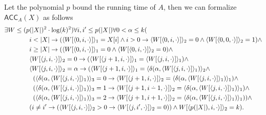 \documentclass{LMCS}
\newcommand{\abs}[1]{\left\vert#1\right\vert}
\newcommand{\dotminus}{\mathbin{\setbox0\hbox{$-$}\setbox2\hbox to\wd0{\hss$^{\mkern1mu\cdot}$\hss}\wd2=0pt\box2\box0}}
\begin{document}
Let the polynomial $p$ bound the running time of $A$, then we can formalize $\mathsf{ACC}_A(X)$ as follows
\begin{equation}\label{Def ACC}
  \begin{split}
    \exists W\leq (p&(\abs{X})^2\cdot\log (k)^2)\forall i,i'\leq p(\abs{X})
    \forall 0<\alpha\leq k(\\ &
    i<\abs{X}\rightarrow(\langle W[\langle 0,i,\cdot \rangle]\rangle_1 =X[i]\land i> 0\rightarrow \langle
    W[\langle 0,i,\cdot \rangle]\rangle_2 = 0 \land \langle W[\langle 0,0,\cdot
    \rangle]\rangle_2=1)\land\\ & i\geq\abs{X}\rightarrow(\langle W[\langle 0,i,\cdot \rangle]\rangle_1 =0 \land
    \langle W[\langle 0,i,\cdot\rangle]\rangle_2=0)\land\\ & \langle W[\langle j,i,\cdot \rangle]\rangle_2
    =0\rightarrow (\langle W[\langle j+1,i,\cdot \rangle]\rangle_1=
    \langle W[\langle j,i,\cdot \rangle]\rangle_1)\land\\ &
    \langle W[\langle j,i,\cdot \rangle]\rangle_2
    =\alpha\rightarrow (\langle W[\langle j+1,i,\cdot \rangle]\rangle_1=
    \langle\delta(\alpha,\langle W[\langle j,i,\cdot \rangle]\rangle_1)\rangle_2\land\\ &
    \hspace{0.2cm}(\langle\delta(\alpha,\langle W[\langle j,i,\cdot \rangle]\rangle_1)\rangle_3=0 \rightarrow
    \langle W[\langle j+1,i,\cdot \rangle]\rangle_2=
    \langle\delta(\alpha,\langle W[\langle j,i,\cdot \rangle]\rangle_1)\rangle_1)\land\\ &
    \hspace{0.2cm}(\langle\delta(\alpha,\langle W[\langle j,i,\cdot \rangle]\rangle_1)\rangle_3=1 \rightarrow
    \langle W[\langle j+1,i\dotminus 1,\cdot \rangle]\rangle_2=
    \langle\delta(\alpha,\langle W[\langle j,i,\cdot \rangle]\rangle_1)\rangle_1)\land\\ &
    \hspace{0.2cm}(\langle\delta(\alpha,\langle W[\langle j,i,\cdot \rangle]\rangle_1)\rangle_3=2 \rightarrow
    \langle W[\langle j+1,i+1,\cdot \rangle]\rangle_2=
    \langle\delta(\alpha,\langle W[\langle j,i,\cdot \rangle]\rangle_1)\rangle_1))\land\\ &
    (i\neq i'\rightarrow (\langle W[\langle j,i,\cdot \rangle]\rangle_2>0\rightarrow
    \langle W[\langle j,i',\cdot \rangle]\rangle_2=0))\land
    W[\langle p(\abs X),i,\cdot \rangle]\rangle_2 = k).
  \end{split}
\end{equation}
\end{document}
